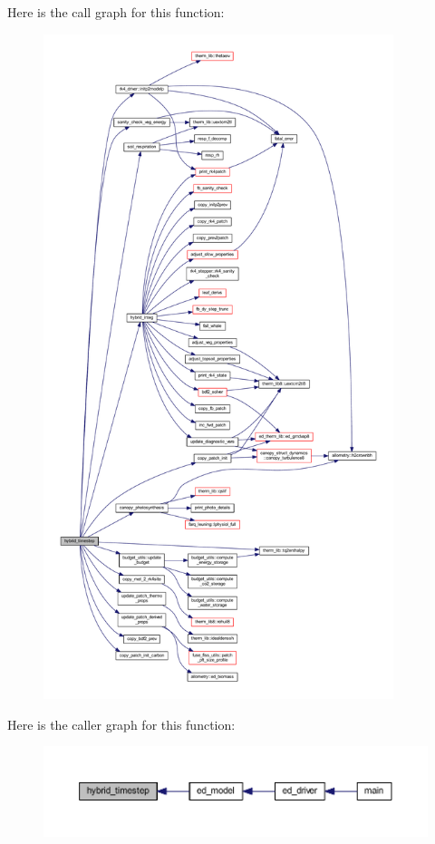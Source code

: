 Here is the call graph for this function\+:\nopagebreak
\begin{figure}[H]
\begin{center}
\leavevmode
\includegraphics[height=550pt]{hybrid__driver_8f90_a9df1061f35d458ad00001665377c1680_cgraph}
\end{center}
\end{figure}




Here is the caller graph for this function\+:\nopagebreak
\begin{figure}[H]
\begin{center}
\leavevmode
\includegraphics[width=350pt]{hybrid__driver_8f90_a9df1061f35d458ad00001665377c1680_icgraph}
\end{center}
\end{figure}


